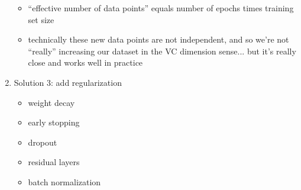 \documentclass[10pt]{exam}
\theoremstyle{definition}
\newtheorem{problem}{Problem}
\begin{document}
\begin{enumerate}
\begin{itemize}
            \item ``effective number of data points'' equals number of epochs times training set size

            \item technically these new data points are not independent,
  and so we're not ``really'' increasing our dataset in the VC dimension sense... but it's really close and works well in practice

        \end{itemize}

  \item
Solution 3: add regularization
        \begin{itemize}
            \item weight decay
            \item early stopping
            \item dropout
            \item residual layers
            \item batch normalization
        \end{itemize}

\end{enumerate}

%
\end{document}
